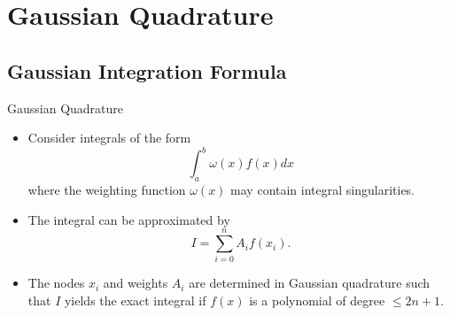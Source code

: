 \documentclass{beamer}
\begin{document}
\section[Gaussian Quadrature]{Gaussian Quadrature}
\subsection[Gaussian Integration Formula]{Gaussian Integration Formula}
\begin{frame}{Gaussian Quadrature}
\begin{itemize}
\item Consider integrals of the form
\[
\int_a ^b \omega (x) f(x) dx
\]
where the weighting function $\omega(x)$ may contain integral singularities.
\item The integral can be approximated by 
\[
I=\sum_{i=0}^n A_i f(x_i).
\]
\item The nodes $x_i$ and weights $A_i$ are determined in Gaussian quadrature such that $I$ yields the exact integral if $f(x)$ is a polynomial of degree $\le 2n +1$.
\end{itemize}
\end{frame}
\end{document}
